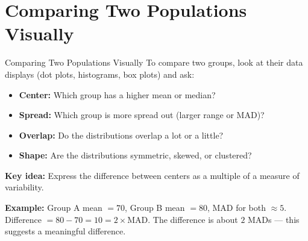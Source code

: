 \section{Comparing Two Populations Visually}

\begin{quickReview}{Comparing Two Populations Visually}
To compare two groups, look at their data displays (dot plots, histograms, box plots) and ask:

\begin{itemize}[leftmargin=*]
    \item \textbf{Center:} Which group has a higher mean or median?
    \item \textbf{Spread:} Which group is more spread out (larger range or MAD)?
    \item \textbf{Overlap:} Do the distributions overlap a lot or a little?
    \item \textbf{Shape:} Are the distributions symmetric, skewed, or clustered?
\end{itemize}

\medskip
\textbf{Key idea:} Express the difference between centers as a multiple of a measure of variability.

\smallskip
\textbf{Example:} Group A mean $= 70$, Group B mean $= 80$, MAD for both $\approx 5$. Difference $= 80 - 70 = 10 = 2 \times \text{MAD}$. The difference is about $2$ MADs — this suggests a meaningful difference.
\end{quickReview}

